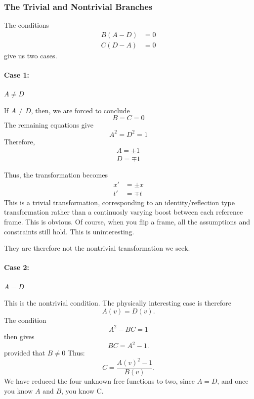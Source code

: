 	\subsubsection{The Trivial and Nontrivial Branches}
		The conditions
		\begin{align}
			B(A-D)&=0\\
			C(D-A)&=0
		\end{align}
		give us two cases.

		\paragraph{Case 1:} $A\neq D$

			If $A\neq D$, then, we are forced to conclude
			\begin{equation}
				B = C = 0
			\end{equation}
			The remaining equations give
			\begin{equation}
				A^2 = D^2 = 1
			\end{equation}
			Therefore,
			\begin{align*}
				A = \pm 1\\
				D = \mp 1
			\end{align*}

			Thus, the transformation becomes
			\begin{align*}
				x' &= \pm x\\
				t' &= \mp t
			\end{align*}
			This is a trivial transformation, corresponding to an identity/reflection type transformation
			rather than a continuosly varying boost between each reference frame. This is obvious. Of course, when you
			flip a frame, all the assumptions and constraints still hold. This is uninteresting.

			They are therefore not the nontrivial transformation we seek.
		\paragraph{Case 2:} $A=D$

			This is the nontrivial condition. The physically interesting case is therefore
			\begin{equation}
			A(v)=D(v).
			\end{equation}
			The condition
			\begin{equation}
				A^2-BC=1
			\end{equation}
			then gives
			\begin{equation}
				BC=A^2-1.
			\end{equation}
			provided that $B\neq 0$
			Thus:
			\begin{equation}
				C = \frac{A(v)^2-1}{B(v)}.
			\end{equation}
			We have reduced the four unknown free functions to two, since $A=D$, and once you know $A$ and $B$, you know C.
